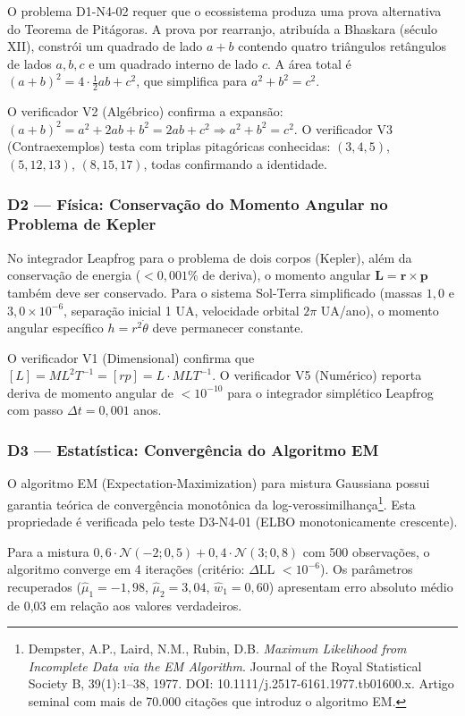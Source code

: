 O problema D1-N4-02 requer que o ecossistema produza uma prova alternativa do
Teorema de Pitágoras. A prova por rearranjo, atribuída a Bhaskara (século XII),
constrói um quadrado de lado $a+b$ contendo quatro triângulos retângulos de
lados $a,b,c$ e um quadrado interno de lado $c$. A área total é $(a+b)^2 =
4\cdot\frac{1}{2}ab + c^2$, que simplifica para $a^2 + b^2 = c^2$.

O verificador V2 (Algébrico) confirma a expansão: $(a+b)^2 = a^2 + 2ab + b^2 =
2ab + c^2 \Rightarrow a^2 + b^2 = c^2$. O verificador V3 (Contraexemplos) testa
com triplas pitagóricas conhecidas: $(3,4,5)$, $(5,12,13)$, $(8,15,17)$, todas
confirmando a identidade.

\subsubsection{D2 — Física: Conservação do Momento Angular no Problema de Kepler}

No integrador Leapfrog para o problema de dois corpos (Kepler), além da
conservação de energia ($< 0,001\%$ de deriva), o momento angular
$\mathbf{L} = \mathbf{r} \times \mathbf{p}$ também deve ser conservado.
Para o sistema Sol-Terra simplificado (massas $1,0$ e $3,0\times10^{-6}$,
separação inicial 1 UA, velocidade orbital $2\pi$ UA/ano), o momento angular
específico $h = r^2\dot{\theta}$ deve permanecer constante.

O verificador V1 (Dimensional) confirma que $[L] = ML^2T^{-1} = [rp] =
L\cdot MLT^{-1}$. O verificador V5 (Numérico) reporta deriva de momento
angular de $< 10^{-10}$ para o integrador simplético Leapfrog com passo
$\Delta t = 0,001$ anos.

\subsubsection{D3 — Estatística: Convergência do Algoritmo EM}

O algoritmo EM (Expectation-Maximization) para mistura Gaussiana possui
garantia teórica de convergência monotônica da log-verossimilhança\footnote{Dempster, A.P., Laird, N.M., Rubin, D.B. \textit{Maximum Likelihood from
Incomplete Data via the EM Algorithm}. Journal of the Royal Statistical
Society B, 39(1):1--38, 1977. DOI: 10.1111/j.2517-6161.1977.tb01600.x.
Artigo seminal com mais de 70.000 citações que introduz o algoritmo EM.}.
Esta propriedade é verificada pelo teste D3-N4-01 (ELBO monotonicamente
crescente).

Para a mistura $0,6\cdot\mathcal{N}(-2; 0,5) + 0,4\cdot\mathcal{N}(3; 0,8)$
com 500 observações, o algoritmo converge em 4 iterações (critério: $\Delta$LL
$< 10^{-6}$). Os parâmetros recuperados ($\hat{\mu}_1 = -1,98$,
$\hat{\mu}_2 = 3,04$, $\hat{w}_1 = 0,60$) apresentam erro absoluto médio
de 0,03 em relação aos valores verdadeiros.

